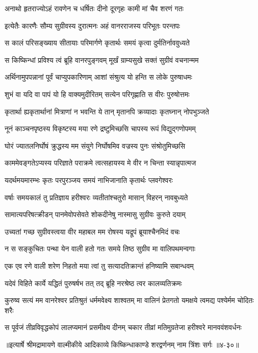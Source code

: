 \twolineshloka
{अनाथो हृतराज्योऽहं रावणेन च धर्षितः}
{दीनो दूरगृहः कामी मां चैव शरणं गतः} %

\twolineshloka
{इत्येतैः कारणैः सौम्य सुग्रीवस्य दुरात्मनः}
{अहं वानरराजस्य परिभूतः परन्तपः} %

\twolineshloka
{स कालं परिसङ्ख्याय सीतायाः परिमार्गणे}
{कृतार्थः समयं कृत्वा दुर्मतिर्नाववुध्यते} %

\twolineshloka
{स किष्किन्धां प्रविश्य त्वं ब्रूहि वानरपुङ्गवम्}
{मूर्खं ग्राम्यसुखे सक्तं सुग्रीवं वचनान्मम} %

\twolineshloka
{अर्थिनामुपपन्नानां पूर्वं चाप्युपकारिणाम्}
{आशां संश्रुत्य यो हन्ति स लोके पुरुषाधमः} %

\twolineshloka
{शुभं वा यदि वा पापं यो हि वाक्यमुदीरितम्}
{सत्येन परिगृह्णाति स वीरः पुरुषोत्तमः} %

\twolineshloka
{कृतार्था ह्यकृतार्थानां मित्राणां न भवन्ति ये}
{तान् मृतानपि क्रव्यादाः कृतघ्नान् नोपभुञ्जते} %

\twolineshloka
{नूनं काञ्चनपृष्ठस्य विकृष्टस्य मया रणे}
{द्रष्टुमिच्छसि चापस्य रूपं विद्युद्गणोपमम्} %

\twolineshloka
{घोरं ज्यातलनिर्घोषं क्रुद्धस्य मम संयुगे}
{निर्घोषमिव वज्रस्य पुनः संश्रोतुमिच्छसि} %

\twolineshloka
{काममेवङ्गतेऽप्यस्य परिज्ञाते पराक्रमे}
{त्वत्सहायस्य मे वीर न चिन्ता स्यान्नृपात्मज} %

\twolineshloka
{यदर्थमयमारम्भः कृतः परपुरञ्जय}
{समयं नाभिजानाति कृतार्थः प्लवगेश्वरः} %

\twolineshloka
{वर्षाः समयकालं तु प्रतिज्ञाय हरीश्वरः}
{व्यतीतांश्चतुरो मासान् विहरन् नावबुध्यते} %

\twolineshloka
{सामात्यपरिषत्क्रीडन् पानमेवोपसेवते}
{शोकदीनेषु नास्मासु सुग्रीवः कुरुते दयाम्} %

\twolineshloka
{उच्यतां गच्छ सुग्रीवस्त्वया वीर महाबल}
{मम रोषस्य यद्रूपं ब्रूयाश्चैनमिदं वचः} %

\twolineshloka
{न स सङ्कुचितः पन्था येन वाली हतो गतः}
{समये तिष्ठ सुग्रीव मा वालिपथमन्वगाः} %

\twolineshloka
{एक एव रणे वाली शरेण निहतो मया}
{त्वां तु सत्यादतिक्रान्तं हनिष्यामि सबान्धवम्} %

\twolineshloka
{यदेवं विहिते कार्ये यद्धितं पुरुषर्षभ}
{तत् तद् ब्रूहि नरश्रेष्ठ त्वर कालव्यतिक्रमः} %

\twolineshloka
{कुरुष्व सत्यं मम वानरेश्वर प्रतिश्रुतं धर्ममवेक्ष्य शाश्वतम्}
{मा वालिनं प्रेतगतो यमक्षये त्वमद्य पश्येर्मम चोदितः शरैः} %

\twolineshloka
{स पूर्वजं तीव्रविवृद्धकोपं लालप्यमानं प्रसमीक्ष्य दीनम्}
{चकार तीव्रां मतिमुग्रतेजा हरीश्वरे मानववंशवर्धनः} %


॥इत्यार्षे श्रीमद्रामायणे वाल्मीकीये आदिकाव्ये किष्किन्धाकाण्डे शरद्वर्णनम् नाम त्रिंशः सर्गः ॥४-३०॥
